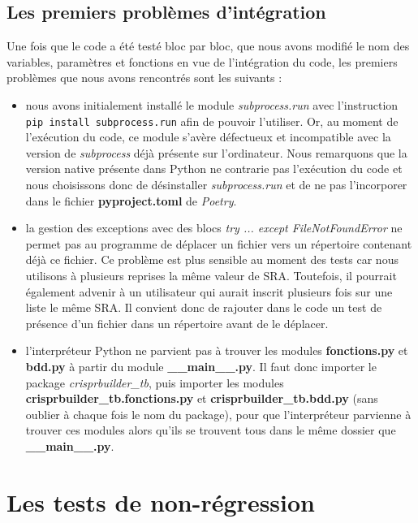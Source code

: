 \documentclass[twoside,a4paper,11pt,frenchb,openany]{report}
\begin{document}
\subsection{Les premiers problèmes d'intégration}

Une fois que le code a été testé bloc par bloc, que nous avons modifié le nom des variables, paramètres et fonctions en vue de l'intégration du code, les premiers problèmes que nous avons rencontrés sont les suivants :  
\begin{itemize}
\item nous avons initialement installé le module \textit{subprocess.run} avec l'instruction \\\texttt{pip install subprocess.run} afin de pouvoir l'utiliser. Or, au moment de l'exécution du code, ce module s'avère défectueux et incompatible avec la version de \textit{subprocess} déjà présente sur l'ordinateur. Nous remarquons que la version native présente dans Python ne contrarie pas l'exécution du code et nous choisissons donc de désinstaller \textit{subprocess.run} et de ne pas l'incorporer dans le fichier \textbf{pyproject.toml} de \textit{Poetry}.
\item la gestion des exceptions avec des blocs \textit{try ... except FileNotFoundError} ne permet pas au programme de déplacer un fichier vers un répertoire contenant déjà ce fichier. Ce problème est plus sensible au moment des tests car nous utilisons à plusieurs reprises la même valeur de SRA. Toutefois, il pourrait également advenir à un utilisateur qui aurait inscrit plusieurs fois sur une liste le même SRA. Il convient donc de rajouter dans le code un test de présence d'un fichier dans un répertoire avant de le déplacer.
\item l'interpréteur Python ne parvient pas à trouver les modules \textbf{fonctions.py} et \textbf{bdd.py} à partir du module \textbf{\_\_main\_\_.py}. Il faut donc importer le package \textit{crisprbuilder\_tb}, puis importer les modules \textbf{crisprbuilder\_tb.fonctions.py} et \textbf{crisprbuilder\_tb.bdd.py} (sans oublier à chaque fois le nom du package), pour que l'interpréteur parvienne à trouver ces modules alors qu'ils se trouvent tous dans le même dossier que \textbf{\_\_main\_\_.py}.
\end{itemize}






\section{Les tests de non-régression}
\end{document}
